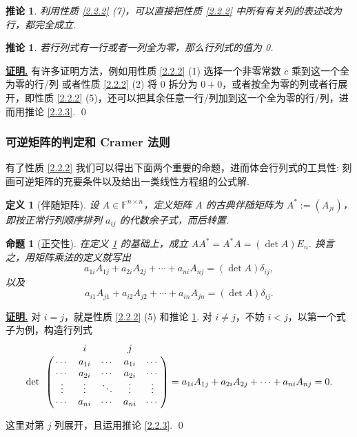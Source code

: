 \documentclass[10pt,openany]{article}
\theoremstyle{thmstyle} %
\theoremstyle{defstyle} %
\newtheorem{definition}[theorem]{定义}
\newtheorem{corollary}[theorem]{推论}
\theoremstyle{prostyle} %
\newtheorem{proposition}[theorem]{命题}
\theoremstyle{exastyle}
\theoremstyle{remstyle}
\renewenvironment{proof}[1][证明]{\par\underline{\textbf{#1.}} \;\fangsong}{\qed\par}
\newcommand{\F}{\mathbb{F}}
\newcommand{\n}{^{n \times n}}
\begin{document}
\begin{corollary}	\label{2.2.4}
	利用性质 \ref{2.2.2} (7)，可以直接把性质 \ref{2.2.2} 中所有有关列的表述改为行，都完全成立.

\end{corollary}

\begin{corollary}\label{2.2.5}
	若行列式有一行或者一列全为零，那么行列式的值为 0.
	
\end{corollary}

\begin{proof}
	有许多证明方法，例如用性质 \ref{2.2.2} (1) 选择一个非零常数 \( c \) 乘到这一个全为零的行/列 或者性质 \ref{2.2.2} (2) 将 \( 0 \) 拆分为 \( 0+0 \)，或者按全为零的列或者行展开，即性质 \ref{2.2.2} (5)，还可以把其余任意一行/列加到这一个全为零的行/列，进而用推论 \ref{2.2.3}. 
\end{proof}

\subsubsection{可逆矩阵的判定和 Cramer 法则}

有了性质 \ref{2.2.2} 我们可以得出下面两个重要的命题，进而体会行列式的工具性: 刻画可逆矩阵的充要条件以及给出一类线性方程组的公式解.

\begin{definition}[伴随矩阵]\label{2.2.6}
	设 \( A \in \F\n \)，定义矩阵 \( A \) 的古典伴随矩阵为 \( A^*:=(A_{ji}) \)，即按正常行列顺序排列 \( a_{ij} \) 的代数余子式，而后转置. 
	
\end{definition}

\begin{proposition}[正交性]	\label{2.2.7}
	在定义 \ref{2.2.6} 的基础上，成立 \( AA^*=A^*A=(\det A)E_n \). 换言之，用矩阵乘法的定义就写出
	\[ a_{1i}A_{1j}+a_{2i}A_{2j}+\cdots+a_{ni}A_{nj}=(\det A)\delta_{ij}, \]
	以及
	\[ a_{i1}A_{j1}+a_{i2}A_{j2}+\cdots+a_{in}A_{jn}=(\det A)\delta_{ij}. \]

\end{proposition}

\begin{proof}
	对 \( i=j \)，就是性质 \ref{2.2.2} (5) 和推论 \ref{2.2.4}. 对 \( i \neq j \)，不妨 \( i<j \)，以第一个式子为例，构造行列式
	\[ \det \bordermatrix{
		& & i & & j &  \cr
		&\cdots & a_{1i} & \cdots & a_{1i} & \cdots \cr
		&\cdots & a_{2i} & \cdots & a_{2i} & \cdots \cr
		&\vdots & \vdots & \ddots & \vdots & \vdots \cr
		&\cdots & a_{ni} & \cdots & a_{ni} & \cdots 
	}= a_{1i}A_{1j}+a_{2i}A_{2j}+\cdots+a_{ni}A_{nj}=0. \]
	
	这里对第 \( j \) 列展开，且运用推论 \ref{2.2.3}.
\end{proof}
\end{document}
